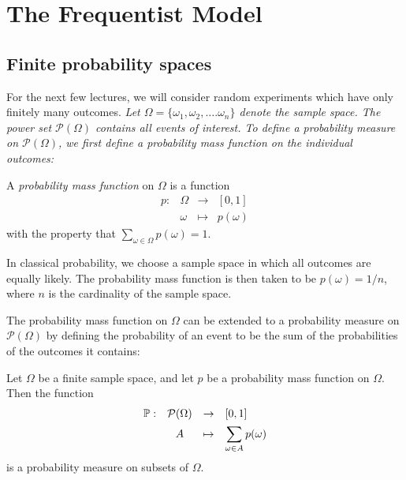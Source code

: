 \chapter{The Frequentist Model}\label{chap:freq}

\section{Finite probability spaces}
For the next few lectures, we will consider random experiments which have only finitely many outcomes.
\bit
\it Let $\Omega = \{\omega_1,\omega_2,\ldots.\omega_n\}$ denote the sample space.
\eit
The power set $\mathcal{P}(\Omega)$ contains all events of interest. To define a probability measure on $\mathcal{P}(\Omega)$, we first define a \emph{probability mass function} on the individual outcomes:
\begin{definition}\label{def:pmf_on_sample_space}
A \emph{probability mass function} on $\Omega$ is a function 
\[
\begin{array}{rccl}
	p :	& \Omega		& \to		& [0,1] \\
		& \omega		& \mapsto	& p(\omega)
\end{array}
\]
with the property that $\displaystyle\sum_{\omega\in\Omega} p(\omega) = 1$.
\end{definition}

\begin{remark}
In classical probability, we choose a sample space in which all outcomes are equally likely. The probability mass function is then taken to be $p(\omega)=1/n$, where $n$ is the cardinality of the sample space. 
\end{remark}

The probability mass function on $\Omega$ can be extended to a probability measure on $\mathcal{P}(\Omega)$ by defining the probability of an event to be the sum of the probabilities of the outcomes it contains:

\begin{theorem}
Let $\Omega$ be a finite sample space, and let $p$ be a probability mass function on $\Omega$. Then the function 
\[
\begin{array}{rccl}
	\mathbb{P}:	& \mathcal{P}(\Omega)	& \to		& [0,1] \\[1ex]
			& A						& \mapsto	& \displaystyle\sum_{\omega\in A} p(\omega)
\end{array}
\]
is a probability measure on subsets of $\Omega$.
\end{theorem}

